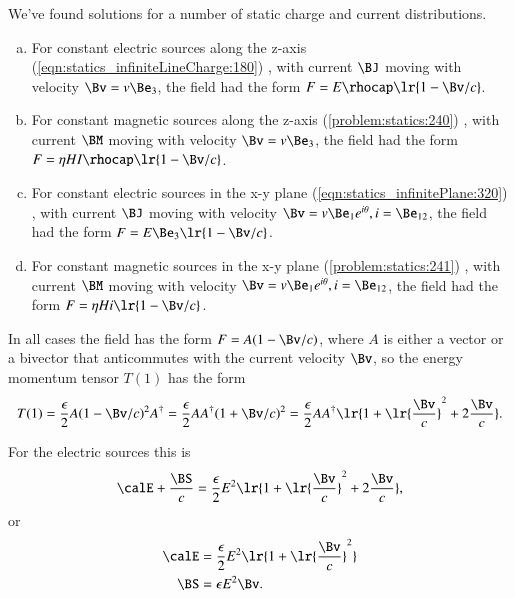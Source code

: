 %
%

We've found solutions for a number of static charge and current distributions.

\begin{enumerate}[(a)]
\item For constant electric sources along the z-axis
(\cref{eqn:statics_infiniteLineCharge:180})
, with current \( \BJ \) moving with velocity \( \Bv = v \Be_3 \), the field had the form \( F = E \rhocap \lr{ 1 - \Bv/c } \).
\item For constant magnetic sources along the z-axis
(\cref{problem:statics:240})
, with current \( \BM \) moving with velocity \( \Bv = v \Be_3 \), the field had the form \( F = \eta H I \rhocap \lr{ 1 - \Bv/c } \).
\item For constant electric sources in the x-y plane
(\cref{eqn:statics_infinitePlane:320})
, with current \( \BJ \) moving with velocity \( \Bv = v \Be_1 e^{i\theta}, i = \Be_{12} \), the field had the form \( F = E \Be_3 \lr{ 1 - \Bv/c } \).
\item For constant magnetic sources in the x-y plane
(\cref{problem:statics:241})
, with current \( \BM \) moving with velocity \( \Bv = v \Be_1 e^{i\theta}, i = \Be_{12} \), the field had the form \( F = \eta H i \lr{ 1 - \Bv/c } \).
\end{enumerate}

In all cases the field has the form \( F = A ( 1 - \Bv/c ) \), where \( A \) is either a vector or a bivector that anticommutes with the current velocity \( \Bv \), so the energy momentum tensor \( T(1) \) has the form
\begin{dmath}\label{eqn:poyntingStaticExamples:860}
T(1)
= \frac{\epsilon}{2} A ( 1 - \Bv/c )^2 A^\dagger
= \frac{\epsilon}{2} A A^\dagger ( 1 + \Bv/c )^2
= \frac{\epsilon}{2} A A^\dagger \lr{ 1 + \lr{ \frac{\Bv}{c} }^2 + 2 \frac{\Bv}{c} }.
\end{dmath}

For the electric sources this is
\begin{dmath}\label{eqn:poyntingStaticExamples:880}
\calE + \frac{\BS}{c} = \frac{\epsilon}{2} E^2 \lr{ 1 + \lr{ \frac{\Bv}{c} }^2 + 2 \frac{\Bv}{c} },
\end{dmath}
or
\begin{dmath}\label{eqn:poyntingStaticExamples:900}
\begin{aligned}
\calE &= \frac{\epsilon}{2} E^2 \lr{ 1 + \lr{ \frac{\Bv}{c} }^2 } \\
\BS &= \epsilon E^2 \Bv.
\end{aligned}
\end{dmath}


